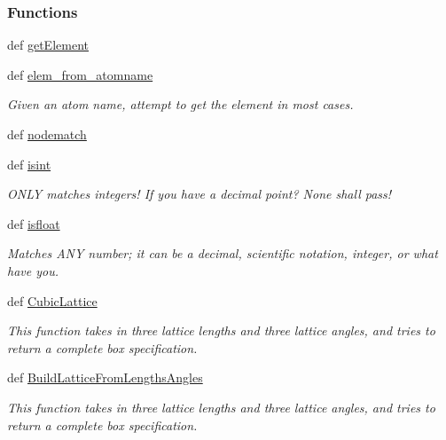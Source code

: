 \subsubsection*{Functions}
\begin{DoxyCompactItemize}
\item 
def \hyperlink{namespaceforcebalance_1_1molecule_af28de4693e5b8e82df900d0ac3c6c370}{get\-Element}
\item 
def \hyperlink{namespaceforcebalance_1_1molecule_a7429f0c377d6396711c128f6590ef810}{elem\-\_\-from\-\_\-atomname}
\begin{DoxyCompactList}\small\item\em Given an atom name, attempt to get the element in most cases. \end{DoxyCompactList}\item 
def \hyperlink{namespaceforcebalance_1_1molecule_ab8464fea13fad2a506792c2f1d7c93f3}{nodematch}
\item 
def \hyperlink{namespaceforcebalance_1_1molecule_a0dd31eff88d2bed0884ab21a13261d42}{isint}
\begin{DoxyCompactList}\small\item\em O\-N\-L\-Y matches integers! If you have a decimal point? None shall pass! \end{DoxyCompactList}\item 
def \hyperlink{namespaceforcebalance_1_1molecule_afe989ffd119568047fc8265b1d329a70}{isfloat}
\begin{DoxyCompactList}\small\item\em Matches A\-N\-Y number; it can be a decimal, scientific notation, integer, or what have you. \end{DoxyCompactList}\item 
def \hyperlink{namespaceforcebalance_1_1molecule_aa2020b34bd18c73558cf39334b204981}{Cubic\-Lattice}
\begin{DoxyCompactList}\small\item\em This function takes in three lattice lengths and three lattice angles, and tries to return a complete box specification. \end{DoxyCompactList}\item 
def \hyperlink{namespaceforcebalance_1_1molecule_a0a6e3e79b04534bf2e83d09def189444}{Build\-Lattice\-From\-Lengths\-Angles}
\begin{DoxyCompactList}\small\item\em This function takes in three lattice lengths and three lattice angles, and tries to return a complete box specification. \end{DoxyCompactList}\item 

\end{DoxyCompactItemize}
